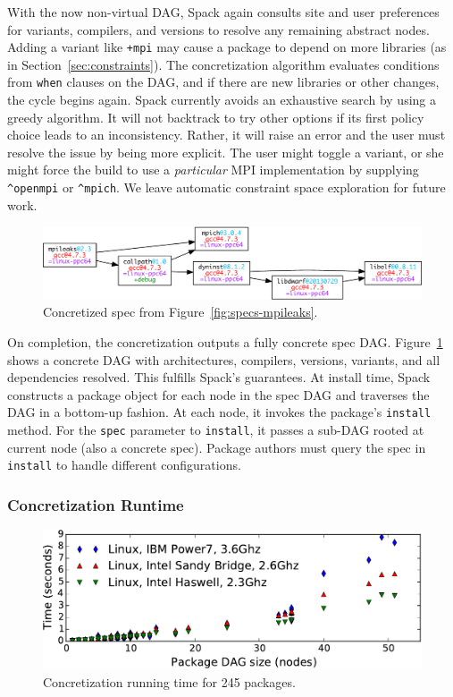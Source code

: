 With the now non-virtual DAG, Spack again consults site and user preferences for
variants, compilers, and versions to resolve any remaining abstract nodes.
Adding a variant like {\tt +mpi} may cause a package to depend on more
libraries (as in Section~\ref{sec:constraints}). The concretization algorithm
evaluates conditions from {\tt when} clauses on the DAG, and if there are
new libraries or other changes, the cycle begins again.
Spack currently avoids an exhaustive search by using a greedy algorithm.
It will not backtrack to try other options if its first policy choice leads
to an inconsistency.  Rather, it will raise an error and the user must resolve
the issue by being more explicit.  The user might toggle a variant, or she might
force the build to use a {\it particular} MPI implementation
by supplying \verb|^openmpi| or \verb|^mpich|.  We leave automatic constraint
space exploration for future work.


\begin{figure}
	\centering
	\includegraphics[width=\columnwidth]{specs/mpileaks-concrete.pdf}
	\caption{
		Concretized spec from Figure~\ref{fig:specs-mpileaks}.
		\label{fig:specs-mpileaks-concrete}
	}
\end{figure}
On completion, the concretization outputs a fully concrete spec DAG.
Figure~\ref{fig:specs-mpileaks-concrete} shows a concrete DAG with architectures,
compilers, versions, variants, and all dependencies resolved.
This fulfills Spack's guarantees.
%
At install time, Spack constructs a package object for each node in the spec DAG
and traverses the DAG in a bottom-up fashion.  At each node, it invokes the package's
{\tt install} method.  For the {\tt spec} parameter to {\tt install}, it passes
a sub-DAG rooted at current node (also a concrete spec).  Package authors must
query the spec in {\tt install} to handle different configurations.

\subsubsection{Concretization Runtime}
\label{sec:concretization-overhead}

\begin{figure}
	\centering
	\includegraphics[width=.95\columnwidth]{figs/concretization-overhead/concretization-times.pdf}
	\caption{
		Concretization running time for 245 packages.
		\label{fig:concretization-time}
	}
\end{figure}

